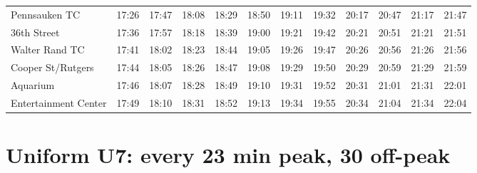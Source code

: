 \begin{center}
\begin{tabular}{@{}lrrrrrrrrrrr@{}}
Pennsauken TC & 17:26 & 17:47 & 18:08 & 18:29 & 18:50 & 19:11 & 19:32 & 20:17 & 20:47 & 21:17 & 21:47 \\
36th Street & 17:36 & 17:57 & 18:18 & 18:39 & 19:00 & 19:21 & 19:42 & 20:21 & 20:51 & 21:21 & 21:51 \\
Walter Rand TC & 17:41 & 18:02 & 18:23 & 18:44 & 19:05 & 19:26 & 19:47 & 20:26 & 20:56 & 21:26 & 21:56 \\
Cooper St/Rutgers & 17:44 & 18:05 & 18:26 & 18:47 & 19:08 & 19:29 & 19:50 & 20:29 & 20:59 & 21:29 & 21:59 \\
Aquarium & 17:46 & 18:07 & 18:28 & 18:49 & 19:10 & 19:31 & 19:52 & 20:31 & 21:01 & 21:31 & 22:01 \\
Entertainment Center & 17:49 & 18:10 & 18:31 & 18:52 & 19:13 & 19:34 & 19:55 & 20:34 & 21:04 & 21:34 & 22:04 \\
\bottomrule\end{tabular}\end{center}
\clearpage
\section{Uniform U7: every 23 min peak, 30 off-peak}\label{tt:uniform_U7}
